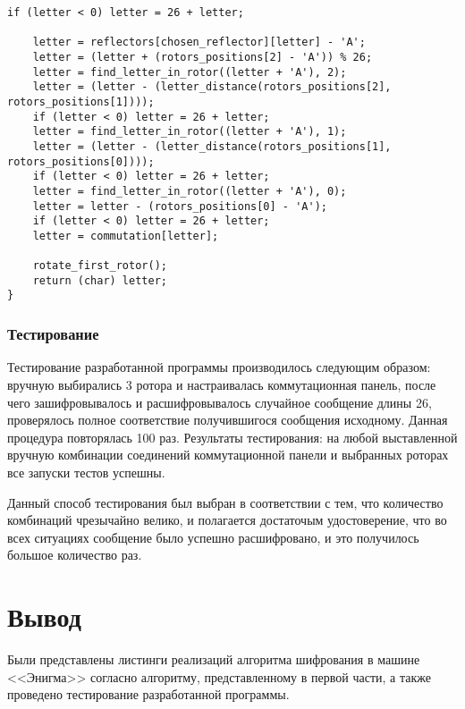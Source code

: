 \begin{center}
    \captionsetup{justification=raggedright,singlelinecheck=off}
    \begin{lstlisting}[label=lst:enigma2,caption=Реализация алгоритма шифрования машины <<Энигма>>]
    if (letter < 0) letter = 26 + letter;

    letter = reflectors[chosen_reflector][letter] - 'A';
    letter = (letter + (rotors_positions[2] - 'A')) % 26;
    letter = find_letter_in_rotor((letter + 'A'), 2);
    letter = (letter - (letter_distance(rotors_positions[2], rotors_positions[1])));
    if (letter < 0) letter = 26 + letter;
    letter = find_letter_in_rotor((letter + 'A'), 1);
    letter = (letter - (letter_distance(rotors_positions[1], rotors_positions[0])));
    if (letter < 0) letter = 26 + letter;
    letter = find_letter_in_rotor((letter + 'A'), 0);
    letter = letter - (rotors_positions[0] - 'A');
    if (letter < 0) letter = 26 + letter;
    letter = commutation[letter];

    rotate_first_rotor();
    return (char) letter;
}
\end{lstlisting}
\end{center}

\subsubsection{Тестирование}

Тестирование разработанной программы производилось следующим образом: вручную выбирались 3 ротора и настраивалась коммутационная панель, после чего зашифровывалось и расшифровывалось случайное сообщение длины 26, проверялось полное соответствие получившигося сообщения исходному.
Данная процедура повторялась 100 раз.
Результаты тестирования: на любой выставленной вручную комбинации соединений коммутационной панели и выбранных роторах все запуски тестов успешны.

Данный способ тестирования был выбран в соответствии с тем, что количество комбинаций чрезычайно велико, и полагается достаточым удостоверение, что во всех ситуациях сообщение было успешно расшифровано, и это получилось большое количество раз.


\section*{Вывод}

Были представлены листинги реализаций алгоритма шифрования в машине <<Энигма>> согласно алгоритму, представленному в первой части, а также проведено тестирование разработанной программы.
